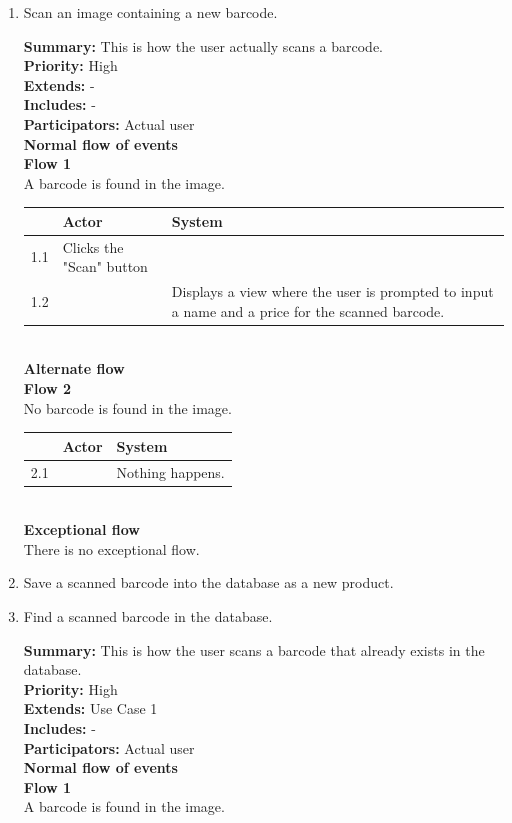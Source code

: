 \documentclass{report}
\begin{document}
\begin{enumerate}

  \item Scan an image containing a new barcode. \

    \textbf{Summary:} This is how the user actually scans a barcode. \\
    \textbf{Priority:} High \\
    \textbf{Extends:} - \\
    \textbf{Includes:} - \\
    \textbf{Participators:} Actual user \\
    \textbf{Normal flow of events} \\
    \textbf{Flow 1} \\ A barcode is found in the image. \\

    \begin{tabular}{ | p{1cm} | p{3cm} | p{4cm} |}
    \hline
      & Actor & System \\ \hline
    1.1 & Clicks the "Scan" button & \\ \hline
    1.2 & & Displays a view where the user is prompted to input a name and a price for the scanned barcode. \\
    \hline
    \end{tabular} \\

    \textbf{Alternate flow} \\
    \textbf{Flow 2} \\ No barcode is found in the image. \\

    \begin{tabular}{ | p{1cm} | p{3cm} | p{4cm} |}
    \hline
      & Actor & System \\ \hline
    2.1 & & Nothing happens. \\
    \hline
    \end{tabular} \\

    \textbf{Exceptional flow} \\ There is no exceptional flow.

  \item Save a scanned barcode into the database as a new product. \

  \item Find a scanned barcode in the database. \

    \textbf{Summary:} This is how the user scans a barcode that already exists in the database. \\
    \textbf{Priority:} High \\
    \textbf{Extends:} Use Case 1 \\
    \textbf{Includes:} - \\
    \textbf{Participators:} Actual user \\
    \textbf{Normal flow of events} \\
    \textbf{Flow 1} \\ A barcode is found in the image. \\


\end{enumerate}
\end{document}
